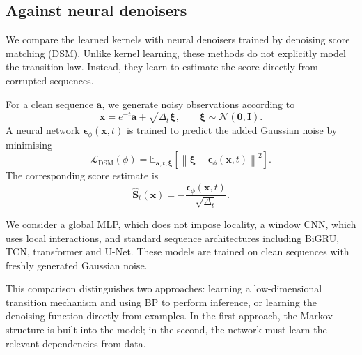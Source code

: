 \subsection{Against neural denoisers}
\label{sec:neural-denoisers}

We compare the learned kernels with neural denoisers
trained by denoising score matching (DSM). Unlike
kernel learning, these methods do not explicitly
model the transition law. Instead, they learn to
estimate the score directly from corrupted sequences.

For a clean sequence $\mathbf{a}$, we generate noisy
observations according to
\begin{equation}
    \mathbf{x}
    =
    e^{-t}\mathbf{a}
    +
    \sqrt{\Delta_t}\boldsymbol{\xi},
    \qquad
    \boldsymbol{\xi}
    \sim
    \mathcal{N}(\mathbf{0},\mathbf{I}).
\end{equation}
A neural network
$\boldsymbol{\epsilon}_\phi(\mathbf{x},t)$ is trained
to predict the added Gaussian noise by minimising
\begin{equation}
    \mathcal{L}_{\mathrm{DSM}}(\phi)
    =
    \mathbb{E}_{\mathbf{a},t,\boldsymbol{\xi}}
    \left[
        \left\|
            \boldsymbol{\xi}
            -
            \boldsymbol{\epsilon}_\phi
            (\mathbf{x},t)
        \right\|^2
    \right].
    \label{eq:dsm-objective}
\end{equation}
The corresponding score estimate is
\begin{equation}
    \widehat{\mathbf{S}}_t(\mathbf{x})
    =
    -\frac{
        \boldsymbol{\epsilon}_\phi(\mathbf{x},t)
    }{
        \sqrt{\Delta_t}
    }.
\end{equation}

We consider a global MLP, which does not impose
locality, a window CNN, which uses local interactions,
and standard sequence architectures including
BiGRU, TCN, transformer and U-Net. These models are
trained on clean sequences with freshly generated
Gaussian noise.

This comparison distinguishes two approaches:
learning a low-dimensional transition mechanism and
using BP to perform inference, or learning the
denoising function directly from examples. In the
first approach, the Markov structure is built into
the model; in the second, the network must learn the
relevant dependencies from data.